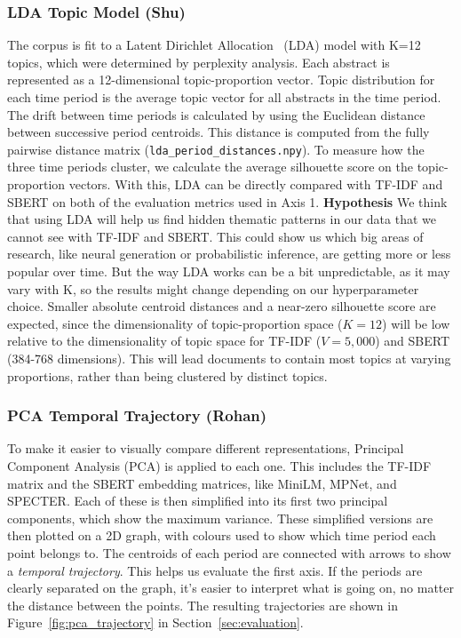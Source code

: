 \documentclass[11pt]{article}
\begin{document}
\subsubsection{LDA Topic Model (Shu)}
The corpus is fit to a Latent Dirichlet Allocation~\cite{blei2003latent} (LDA) model with K=12 topics, which were determined by perplexity analysis. Each abstract is represented as a 12-dimensional topic-proportion vector. Topic distribution for each time period is the average topic vector for all abstracts in the time period. The drift between time periods is calculated by using the Euclidean distance between successive period centroids. This distance is computed from the fully pairwise distance matrix (\texttt{lda\_period\_distances.npy}). To measure how the three time periods cluster, we calculate the average silhouette score on the topic-proportion vectors. With this, LDA can be directly compared with TF-IDF and SBERT on both of the evaluation metrics used in Axis 1.
\textbf{Hypothesis} We think that using LDA will help us find hidden thematic patterns in our data that we cannot see with TF-IDF and SBERT. This could show us which big areas of research, like neural generation or probabilistic inference, are getting more or less popular over time. But the way LDA works can be a bit unpredictable, as it may vary with K, so the results might change depending on our hyperparameter choice. Smaller absolute centroid distances and a near-zero silhouette score are expected, since the dimensionality of topic-proportion space ($K{=}12$) will be low relative to the dimensionality of topic space for TF-IDF ($V{=}5{,}000$) and SBERT (384-768 dimensions). This will lead documents to contain most topics at varying proportions, rather than being clustered by distinct topics.

\subsubsection{PCA Temporal Trajectory (Rohan)}
To make it easier to visually compare different representations, Principal Component Analysis (PCA) is applied to each one. This includes the TF-IDF matrix and the SBERT embedding matrices, like MiniLM, MPNet, and SPECTER. Each of these is then simplified into its first two principal components, which show the maximum variance. These simplified versions are then plotted on a 2D graph, with colours used to show which time period each point belongs to. The centroids of each period are connected with arrows to show a \emph{temporal trajectory}. This helps us evaluate the first axis. If the periods are clearly separated on the graph, it's easier to interpret what is going on, no matter the distance between the points. The resulting trajectories are shown in Figure~\ref{fig:pca_trajectory} in Section~\ref{sec:evaluation}.
\end{document}
